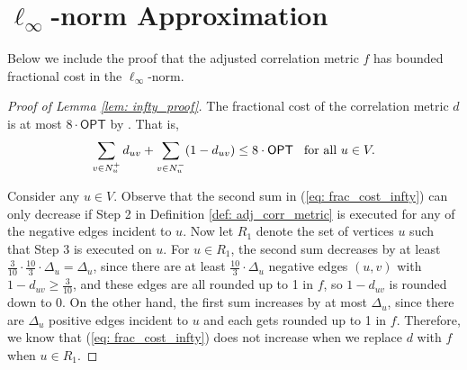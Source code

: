 \documentclass[11pt]{article}
\begin{document}
\section{$\ell_{\infty}$-norm Approximation} \label{sec: infty_norm}
Below we include the proof that the adjusted correlation metric $f$ has bounded fractional cost in the $\ell_{\infty}$-norm. 

\begin{proof}[Proof of Lemma \ref{lem: infty_proof}]
    The fractional cost of the correlation metric $d$ is at most $8 \cdot \textsf{OPT}$ by \cite{DMN23}. That is,
    \begin{equation} \label{eq: frac_cost_infty}
        \sum_{v \in N_u^+} d_{uv} + \sum_{v \in N_u^-} (1-d_{uv}) \leq 8 \cdot \textsf{OPT} \hspace{0.3cm} \text{for all } u \in V.
    \end{equation}

    Consider any $u \in V$. Observe that the second sum in (\ref{eq: frac_cost_infty}) can only decrease if Step 2 in Definition \ref{def: adj_corr_metric} is executed for any of the negative edges incident to $u$. Now let $R_1$ denote the set of vertices $u$ such that Step 3 is executed on $u$. For $u \in R_1$, the  second sum decreases by at least $\frac{3}{10} \cdot \frac{10}{3} \cdot \Delta_u = \Delta_u $, since there are at least $\frac{10}{3}\cdot \Delta_u$ negative edges $(u,v)$ with $1-d_{uv} \geq \frac{3}{10}$, and these edges are all rounded up  to 1 in $f$, so $1-d_{uv}$ is rounded down to 0. On the other hand, the first sum increases by at most $\Delta_u$, since there are $\Delta_u$ positive edges incident to $u$ and each gets rounded up to 1 in $f$. Therefore, we know that (\ref{eq: frac_cost_infty}) does not increase when we replace $d$ with $f$ when $u \in R_1$. 


\end{proof}
\end{document}
